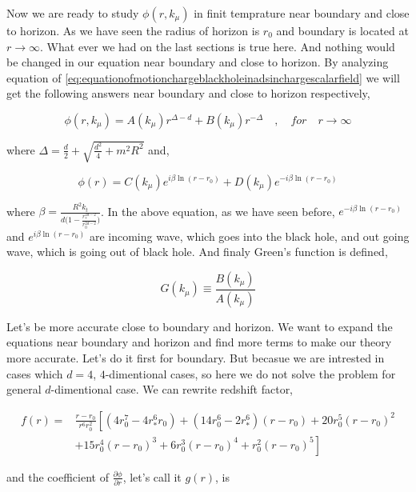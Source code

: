 Now we are ready to study $\phi(r,k_\mu)$ in finit temprature near boundary and close to horizon. As we have seen the radius of horizon is $r_0$ and boundary is located at $r \rightarrow \infty$. What ever we had on the last sections is true here. And nothing would be changed in our equation near boundary and close to horizon. By analyzing equation of \ref{eq:equationofmotionchargeblackholeinadsinchargescalarfield} we will get the following answers near boundary and close to horizon respectively,

\begin{equation}
    \phi(r,k_\mu) = A(k_\mu)r^{\Delta-d} + B(k_\mu)r^{-\Delta} \quad , \quad for \quad r \rightarrow \infty
\end{equation}

where $\Delta = \frac{d}{2} + \sqrt{\frac{d^2}{4} + m^2R^2}$ and,

\begin{equation}
    \phi(r) = C(k_\mu)e^{ i\beta \ln{(r-r_0)}} + D(k_\mu)e^{- i\beta\ln{(r-r_0)}} 
\end{equation}

where $\beta = \frac{R^2k_t}{d\big(1-\frac{r^{2d-2}_*}{r^{2d-2}_0}\big)}$. In the above equation, as we have seen before, $e^{-i\beta \ln{(r-r_0)}}$ and $e^{i\beta \ln{(r-r_0)}}$ are incoming wave, which goes into the black hole, and out going wave, which is going out of black hole. And finaly Green's function is defined,

\begin{equation}
   G(k_\mu) \equiv \frac{B(k_\mu)}{A(k_\mu)}  
\end{equation} 

Let's be more accurate close to boundary and horizon. We want to expand the equations near boundary and horizon and find more terms to make our theory more accurate. Let's do it first for boundary. But becasue we are intrested in cases which $d =4$, $4$-dimentional cases, so here we do not solve the problem for general $d$-dimentional case. We can rewrite redshift factor, 

\begin{align}
    f(r) =& \frac{r-r_0}{r^6r_0^2} \left[ (4r_0^7-4r_*^6r_0) + (14r_0^6-2r_*^6)(r-r_0) + 20r_0^5(r-r_0)^2 \right. \nonumber\\
          &  \left. + 15r_0^4(r-r_0)^3 + 6r_0^3(r-r_0)^4 + r_0^2(r-r_0)^5 \right]
\end{align}

and the coefficient of $\frac{\partial\phi}{\partial r}$, let's call it $g(r)$, is

